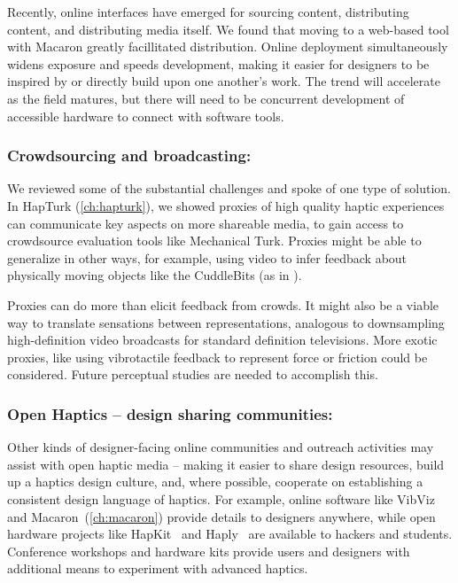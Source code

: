 Recently, online interfaces have emerged for sourcing content, distributing content, and distributing media itself. 
We found that moving to a web-based tool with Macaron greatly facillitated distribution.
Online deployment simultaneously widens exposure and speeds development, making it easier for designers to be inspired by or directly build upon one another's work. 
The trend will accelerate as the field matures, but there will need to be concurrent development of accessible hardware to connect with software tools.

\subsubsection{Crowdsourcing and broadcasting:} 
    We reviewed some of the substantial challenges and spoke of one type of solution.
    In HapTurk (\autoref{ch:hapturk}), we showed proxies of high quality haptic experiences  can communicate key aspects on more shareable media, to gain access to crowdsource evaluation tools like Mechanical Turk.
    Proxies might be able to generalize in other ways, for example, using video to infer feedback about physically moving objects like the CuddleBits (\eg as in \cite{Pedersen2014}).

    Proxies can do more than elicit feedback from crowds.
    It might also be a viable way to translate sensations between representations, analogous to downsampling high-definition video broadcasts for standard definition televisions.
    More exotic proxies, like using vibrotactile feedback to represent force or friction could be considered. 
    Future perceptual studies are needed to accomplish this.
    
\subsubsection{Open Haptics -- design sharing communities:} 
    Other kinds of designer-facing online communities and outreach activities may assist with open haptic media -- making it easier to share design resources,  build up a haptics design culture, and, where possible, cooperate on establishing a consistent design language of haptics. 
%
    For example, online software like VibViz~\cite{seifi2015vibviz} and Macaron~(\autoref{ch:macaron}) provide details to designers anywhere, while open hardware projects like HapKit~\cite{Martinez2016} and Haply~\cite{Gallacher2016} are available to hackers and students.
    Conference workshops and hardware kits provide users and designers with additional means to experiment with advanced haptics.
    
